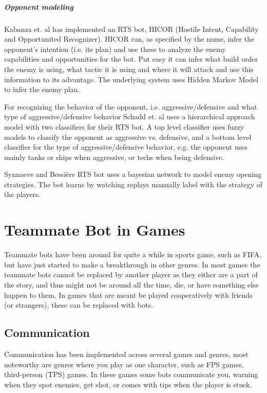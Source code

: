 \subparagraph{Opponent modeling}
Kabanza et. al has implemented an RTS bot, HICOR (Hostile Intent, Capability and Opportunited Recognizer). HICOR can, as specified by the name, infer the opponent's intention (i.e. its plan) and use these to analyze the enemy capabilities and opportunities for the bot. Put easy it can infer what build order the enemy is using, what tactic it is using and where it will attack and use this information to its advantage. The underlying system uses Hidden Markov Model to infer the enemy plan.

For recognizing the behavior of the opponent, i.e. aggressive/defensive and what type of aggressive/defensive behavior Schadd et. al uses a hierarchical approach model with two classifiers for their RTS bot. A top level classifier uses fuzzy models to classify the opponent as aggressive vs. defensive, and a bottom level classifier for the type of aggressive/defensive behavior, e.g. the opponent uses mainly tanks or ships when aggressive, or techs when being defensive.

Synnaeve and Bessière RTS bot uses a bayesian network to model enemy opening strategies\cite{synnaeve11}. The bot learns by watching replays manually label with the strategy of the players.

\section{Teammate Bot in Games}
Teammate bots have been around for quite a while in sports game, such as FIFA\cite{fifa}, but have just started to make a breakthrough in other genres. In most games\cite{callofduty, brotherinarms, rainbow6} the teammate bots cannot be replaced by another player as they either are a part of the story, and thus might not be around all the time, die, or have something else happen to them. In games that are meant be played cooperatively with friends (or strangers), these can be replaced with bots\cite{residentevil5, lostplanet2}.

\subsection{Communication}
\label{sec:game_communication}
Communication has been implemented across several games and genres, most noteworthy are genres where you play as one character, such as FPS games, third-person (TPS) games. In these games some bots communicate you, warning when they spot enemies, get shot, or comes with tips when the player is stuck.


